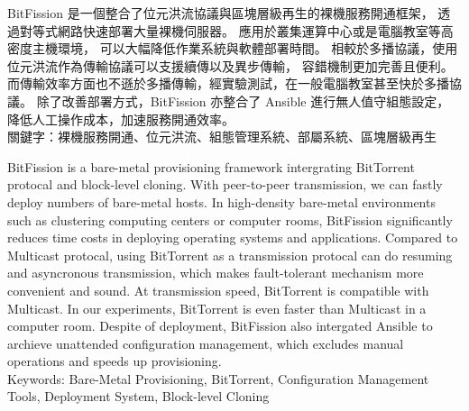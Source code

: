 \begin{abstractzh}
BitFission 是一個整合了位元洪流協議與區塊層級再生的裸機服務開通框架，
透過對等式網路快速部署大量裸機伺服器。
應用於叢集運算中心或是電腦教室等高密度主機環境，
可以大幅降低作業系統與軟體部署時間。
相較於多播協議，使用位元洪流作為傳輸協議可以支援續傳以及異步傳輸，
容錯機制更加完善且便利。
而傳輸效率方面也不遜於多播傳輸，經實驗測試，在一般電腦教室甚至快於多播協議。
除了改善部署方式，BitFission 亦整合了 Ansible 進行無人值守組態設定，
降低人工操作成本，加速服務開通效率。\\

\noindent
關鍵字：裸機服務開通、位元洪流、組態管理系統、部屬系統、區塊層級再生
\end{abstractzh}



\begin{abstracten}
BitFission is a bare-metal provisioning framework intergrating BitTorrent protocal and block-level cloning.
With peer-to-peer transmission, we can fastly deploy numbers of bare-metal hosts.
In high-density bare-metal environments such as clustering computing centers or computer rooms,
BitFission significantly reduces time costs in deploying operating systems and applications.
Compared to Multicast protocal, using BitTorrent as a transmission protocal can do resuming and asyncronous transmission, which makes fault-tolerant mechanism more convenient and sound.
At transmission speed, BitTorrent is compatible with Multicast.
In our experiments, BitTorrent is even faster than Multicast in a computer room.
Despite of deployment, BitFission also intergated Ansible to archieve unattended configuration management,
which excludes manual operations and speeds up provisioning.\\

\noindent
Keywords: Bare-Metal Provisioning, BitTorrent, Configuration Management Tools, Deployment System, Block-level Cloning
\end{abstracten}
